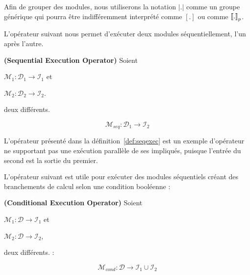 Afin   de  grouper   des   modules,  nous   utiliserons  la   notation $\left|.\right|$ comme un groupe générique qui pourra être indifféremment interprété comme $[.]$ ou comme $\left\llbracket . \right\rrbracket_p$.

L'opérateur suivant nous permet d'exécuter deux modules séquentiellement, l'un après l'autre.

\begin{definition}\label{def:seqexec} {\bf (Sequential Execution Operator)} 
Soient
\begin{inparaenum}[i)]
	\item $\mathcal{M}_1 : \mathcal{D}_1 \rightarrow \mathcal{I}_1$ et
	\item $\mathcal{M}_2 : \mathcal{D}_2 \rightarrow \mathcal{I}_2$.
\end{inparaenum}
deux \ms{} différents. 

\[
\mathcal{M}_{seq}:\mathcal{D}_1 \rightarrow \mathcal{I}_2
\]
\end{definition}


L'opérateur  présenté  dans  la  définition~\ref{def:seqexec}  est  un exemple d'opérateur ne  supportant pas une exécution  parallèle de ses \cms impliqués, puisque l'entrée du second \cm{} est la sortie du premier.


L'opérateur suivant  est utile  pour exécuter des  modules séquentiels créant des branchements de calcul selon une condition booléenne :

\begin{definition}\label{op:conditional}
{\bf (Conditional Execution Operator)} Soient 
\begin{inparaenum}[i)]
	\item $\mathcal{M}_1 : \mathcal{D} \rightarrow \mathcal{I}_1$ et 
	\item $\mathcal{M}_2 : \mathcal{D} \rightarrow \mathcal{I}_2$,
\end{inparaenum} 
deux \ms{} différents. :

\[
\mathcal{M}_{cond}:\mathcal{D} \rightarrow \mathcal{I}_1 \cup \mathcal{I}_2 
\]
\end{definition}

